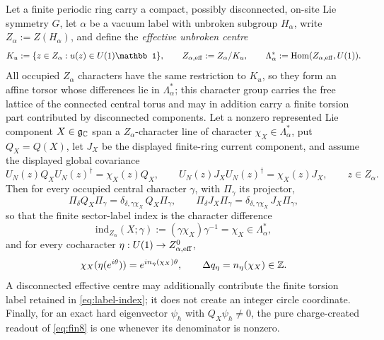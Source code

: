 \begin{theorem}
\label{thm:sector-label}
\statusProved

Let a finite periodic ring carry a compact, possibly disconnected, on-site Lie
symmetry $G$, let $\alpha$ be a vacuum label with unbroken subgroup
$H_\alpha$, write $Z_\alpha:=Z(H_\alpha)$, and define the \emph{effective
unbroken centre}
\begin{equation}
  K_u:=\{z\in Z_\alpha: u(z)\in U(1)\mathbb 1\},
  \qquad
  Z_{\alpha,\rm eff}:=Z_\alpha/K_u,
  \qquad
  \Lambda_\alpha^*:=\Hom(Z_{\alpha,\rm eff},U(1)).
  \label{eq:effective-centre}
\end{equation}
All occupied $Z_\alpha$ characters have the same restriction to $K_u$, so they
form an affine torsor whose differences lie in $\Lambda_\alpha^*$; this
character group carries the free lattice of the connected central torus and
may in addition carry a finite torsion part contributed by disconnected
components. Let a nonzero represented Lie component $X\in\mathfrak g_{\mathbb{C}}$ span
a $Z_\alpha$-character line of character $\chi_X\in\Lambda_\alpha^*$, put
$Q_X=Q(X)$, let $J_X$ be the displayed finite-ring current component, and
assume the displayed global covariance
\begin{equation}
  U_N(z)Q_XU_N(z)^\dagger=\chi_X(z)Q_X,
  \qquad
  U_N(z)J_XU_N(z)^\dagger=\chi_X(z)J_X,
  \qquad z\in Z_\alpha.
  \label{eq:global-covariance}
\end{equation}
Then for every occupied central character $\gamma$, with $\Pi_\gamma$ its
projector,
\begin{equation}
  \Pi_\delta Q_X\Pi_\gamma=\delta_{\delta,\gamma\chi_X}\,Q_X\Pi_\gamma,
  \qquad
  \Pi_\delta J_X\Pi_\gamma=\delta_{\delta,\gamma\chi_X}\,J_X\Pi_\gamma,
  \label{eq:label-blocks}
\end{equation}
so that the finite sector-label index is the character difference
\begin{equation}
  \mathrm{ind}_{Z_\alpha}(X;\gamma):=(\gamma\chi_X)\gamma^{-1}
  =\chi_X\in\Lambda_\alpha^*,
  \label{eq:label-index}
\end{equation}
and for every cocharacter $\eta:U(1)\to Z_{\alpha,\rm eff}^0$,
\begin{equation}
  \chi_X(\eta(e^{i\theta}))=e^{in_\eta(\chi_X)\theta},
  \qquad
  \Delta q_\eta=n_\eta(\chi_X)\in\mathbb{Z}.
  \label{eq:label-integrality}
\end{equation}
A disconnected effective centre may additionally contribute the finite torsion
label retained in \cref{eq:label-index}; it does not create an integer circle
coordinate. Finally, for an exact hard eigenvector $\psi_h$ with
$Q_X\psi_h\neq0$, the pure charge-created readout of \cref{eq:fin8} is one
whenever its denominator is nonzero.
\end{theorem}

